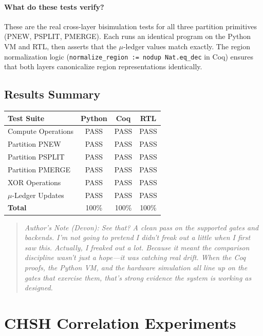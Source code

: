\paragraph{What do these tests verify?} These are the real cross-layer bisimulation tests for all three partition primitives (PNEW, PSPLIT, PMERGE). Each runs an identical program on the Python VM and RTL, then asserts that the $\mu$-ledger values match exactly. The region normalization logic (\texttt{normalize\_region := nodup Nat.eq\_dec} in Coq) ensures that both layers canonicalize region representations identically.

\subsection{Results Summary}

\begin{center}
\begin{tabular}{|l|c|c|c|}
\hline
\textbf{Test Suite} & \textbf{Python} & \textbf{Coq} & \textbf{RTL} \\
\hline
Compute Operations & PASS & PASS & PASS \\
Partition PNEW & PASS & PASS & PASS \\
Partition PSPLIT & PASS & PASS & PASS \\
Partition PMERGE & PASS & PASS & PASS \\
XOR Operations & PASS & PASS & PASS \\
$\mu$-Ledger Updates & PASS & PASS & PASS \\
\hline
\textbf{Total} & 100\% & 100\% & 100\% \\
\hline
\end{tabular}
\end{center}

\begin{quote}
\textit{Author's Note (Devon): See that? A clean pass on the supported gates and backends. I'm not going to pretend I didn't freak out a little when I first saw this. Actually, I freaked out a lot. Because it meant the comparison discipline wasn't just a hope---it was catching real drift. When the Coq proofs, the Python VM, and the hardware simulation all line up on the gates that exercise them, that's strong evidence the system is working as designed.}
\end{quote}

\section{CHSH Correlation Experiments}

